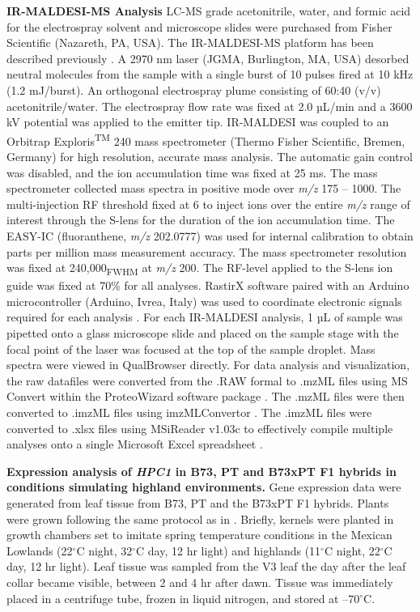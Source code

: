\documentclass[9pt,twocolumn,twoside,lineno]{biorxiv}
\newcommand{\hpc}{\textit{HPC1}\xspace}
\begin{document}
\textbf{IR-MALDESI-MS Analysis}
LC-MS grade acetonitrile, water, and formic acid for the electrospray solvent and microscope slides were purchased from Fisher Scientific (Nazareth, PA, USA). 
The IR-MALDESI-MS platform has been described previously \cite{Caleb_Bagley2021-eh, Bokhart2016-he}. 
A 2970 nm laser (JGMA, Burlington, MA, USA) desorbed neutral molecules from the sample with a single burst of 10 pulses fired at 10 kHz (1.2 mJ/burst). 
An orthogonal electrospray plume consisting of 60:40 (v/v) acetonitrile/water. 
The electrospray flow rate was fixed at 2.0 µL/min and a 3600 kV potential was applied to the emitter tip. 
IR-MALDESI was coupled to an Orbitrap Exploris\textsuperscript{TM} 240 mass spectrometer (Thermo Fisher Scientific, Bremen, Germany) for high resolution, accurate mass analysis. 
The automatic gain control was disabled, and the ion accumulation time was fixed at 25 ms. 
The mass spectrometer collected mass spectra in positive mode over \textit{m/z} 175 – 1000. 
The multi-injection RF threshold fixed at 6 to inject ions over the entire \textit{m/z} range of interest through the S-lens for the duration of the ion accumulation time. 
The EASY-IC (fluoranthene, \textit{m/z} 202.0777) was used for internal calibration to obtain parts per million mass measurement accuracy. 
The mass spectrometer resolution was fixed at 240,000\textsubscript{FWHM} at \textit{m/z} 200. The RF-level applied to the S-lens ion guide was fixed at 70\% for all analyses. 
RastirX software paired with an Arduino microcontroller (Arduino, Ivrea, Italy) was used to coordinate electronic signals required for each analysis \cite{Garrard2020-nt}. 
For each IR-MALDESI analysis, 1 µL of sample was pipetted onto a glass microscope slide and placed on the sample stage with the focal point of the laser was focused at the top of the sample droplet.
Mass spectra were viewed in QualBrowser directly. 
For data analysis and visualization, the raw datafiles were converted from the .RAW formal to .mzML files using MS Convert within the ProteoWizard software package \cite{Chambers2012-da}. 
The .mzML files were then converted to .imzML files using imzMLConvertor \cite{Race2012-wl}. 
The .imzML files were converted to .xlsx files using MSiReader v1.03c to effectively compile multiple analyses onto a single Microsoft Excel spreadsheet \cite{Robichaud2013-ao, Bokhart2018-hs}.

\textbf{Expression analysis of \hpc in B73, PT and B73xPT F1 hybrids in conditions simulating highland environments.}
Gene expression data were generated from leaf tissue from B73, PT and the B73xPT F1 hybrids. 
Plants were grown following the same protocol as in \cite{Crow2020-gene}.
Briefly, kernels were planted in growth chambers set to imitate spring temperature conditions in the Mexican Lowlands (22$^{\circ}$C night, 32$^{\circ}$C day, 12 hr light) and highlands (11$^{\circ}$C night, 22$^{\circ}$C day, 12 hr light). 
Leaf tissue was sampled from the V3 leaf the day after the leaf collar became visible, between 2 and 4 hr after dawn. 
Tissue was immediately placed in a centrifuge tube, frozen in liquid nitrogen, and stored at --70$^{\circ}$C.
\end{document}
